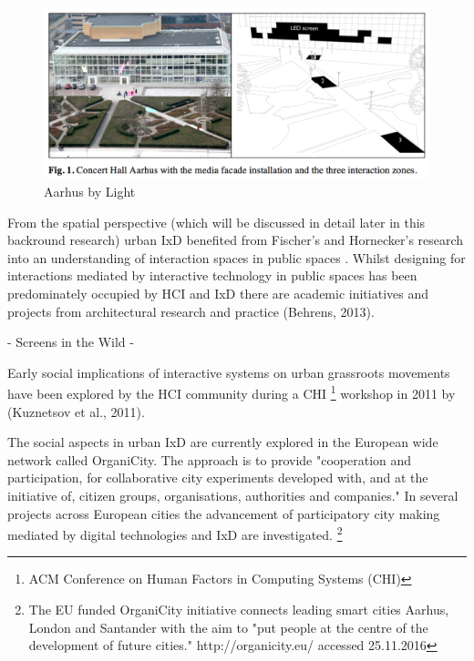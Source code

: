 \begin{figure}[h!]
  \centering
  \includegraphics[width=14cm]{Illustrations/AarhusbyLight.png}
  \caption{Aarhus by Light}
  \label{AarhusbyLight}
  \end{figure}

From the spatial perspective (which will be discussed in detail later in this backround research) urban IxD benefited from Fischer's and Hornecker's research into an understanding of interaction spaces in public spaces \cite{Fischer_2012}.
Whilst designing for interactions mediated by interactive technology in public spaces has been predominately occupied by HCI and IxD there are academic initiatives and projects from architectural research and practice (Behrens, 2013).

- Screens in the Wild
- 


Early social implications of interactive systems on urban grassroots movements have been explored by the HCI community during a CHI \footnote{ACM Conference on Human Factors in Computing Systems (CHI)} workshop in 2011 by (Kuznetsov et al., 2011).

The social aspects in urban IxD are currently explored in the European wide network called OrganiCity. The approach is to provide "cooperation and participation, for collaborative city experiments developed with, and at the initiative of, citizen groups, organisations, authorities and companies." In several projects across European cities the advancement of participatory city making mediated by digital technologies and IxD are investigated.  \footnote{The EU funded OrganiCity initiative connects leading smart cities Aarhus, London and Santander with the aim to "put people at the centre of the development of future cities." http://organicity.eu/ accessed 25.11.2016}

